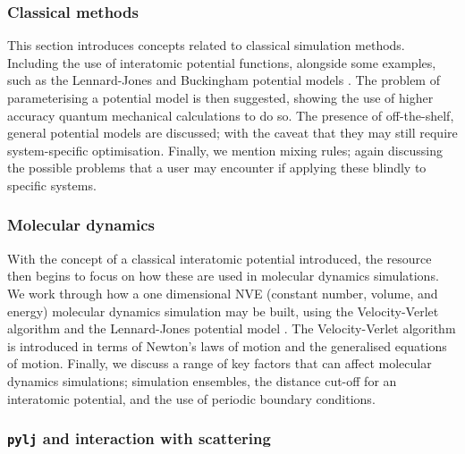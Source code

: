 \subsubsection{Classical methods}

This section introduces concepts related to classical simulation methods.
Including the use of interatomic potential functions, alongside some examples, such as the Lennard-Jones and Buckingham potential models \cite{lennard-jones_determination_1924,buckingham_classical_1938}.
The problem of parameterising a potential model is then suggested, showing the use of higher accuracy quantum mechanical calculations to do so.
The presence of off-the-shelf, general potential models are discussed; with the caveat that they may still require system-specific optimisation.
Finally, we mention mixing rules; again discussing the possible problems that a user may encounter if applying these blindly to specific systems.

\subsubsection{Molecular dynamics}

With the concept of a classical interatomic potential introduced, the resource then begins to focus on how these are used in molecular dynamics simulations.
We work through how a one dimensional NVE (constant number, volume, and energy) molecular dynamics simulation may be built, using the Velocity-Verlet algorithm and the Lennard-Jones potential model \cite{swope_computer_1982,lennard-jones_determination_1924}.
The Velocity-Verlet algorithm is introduced in terms of Newton's laws of motion and the generalised equations of motion.
Finally, we discuss a range of key factors that can affect molecular dynamics simulations; simulation ensembles, the distance cut-off for an interatomic potential, and the use of periodic boundary conditions.

\subsubsection{\texttt{pylj} and interaction with scattering}

